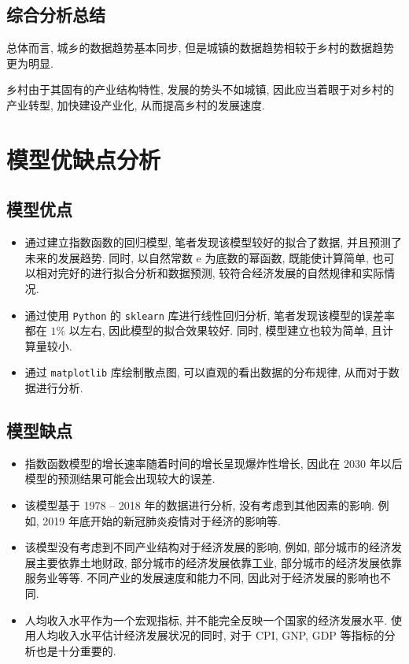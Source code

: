 \documentclass{article}
\begin{document}
\subsection{综合分析总结}

\par 总体而言, 城乡的数据趋势基本同步, 但是城镇的数据趋势相较于乡村的数据趋势更为明显.

\par 乡村由于其固有的产业结构特性, 发展的势头不如城镇, 因此应当着眼于对乡村的产业转型, 加快建设产业化, 从而提高乡村的发展速度.

\section{模型优缺点分析}\label{sec:advantage}

\subsection{模型优点}

\begin{itemize}
  \item 通过建立指数函数的回归模型, 笔者发现该模型较好的拟合了数据, 并且预测了未来的发展趋势. 同时, 以自然常数 $\mathrm e$ 为底数的幂函数, 既能使计算简单, 也可以相对完好的进行拟合分析和数据预测, 较符合经济发展的自然规律和实际情况.
  \item 通过使用 \texttt{Python} 的 \texttt{sklearn} 库进行线性回归分析, 笔者发现该模型的误差率都在 $1\%$ 以左右, 因此模型的拟合效果较好. 同时, 模型建立也较为简单, 且计算量较小.
  \item 通过 \texttt{matplotlib} 库绘制散点图, 可以直观的看出数据的分布规律, 从而对于数据进行分析.
\end{itemize}

\subsection{模型缺点}

\begin{itemize}
  \item 指数函数模型的增长速率随着时间的增长呈现爆炸性增长, 因此在 2030 年以后模型的预测结果可能会出现较大的误差.
  \item 该模型基于 1978 -- 2018 年的数据进行分析, 没有考虑到其他因素的影响. 例如, 2019 年底开始的新冠肺炎疫情对于经济的影响等.
  \item 该模型没有考虑到不同产业结构对于经济发展的影响, 例如, 部分城市的经济发展主要依靠土地财政, 部分城市的经济发展依靠工业, 部分城市的经济发展依靠服务业等等. 不同产业的发展速度和能力不同, 因此对于经济发展的影响也不同.
  \item 人均收入水平作为一个宏观指标, 并不能完全反映一个国家的经济发展水平. 使用人均收入水平估计经济发展状况的同时, 对于 CPI, GNP, GDP 等指标的分析也是十分重要的.
\end{itemize}
\end{document}
